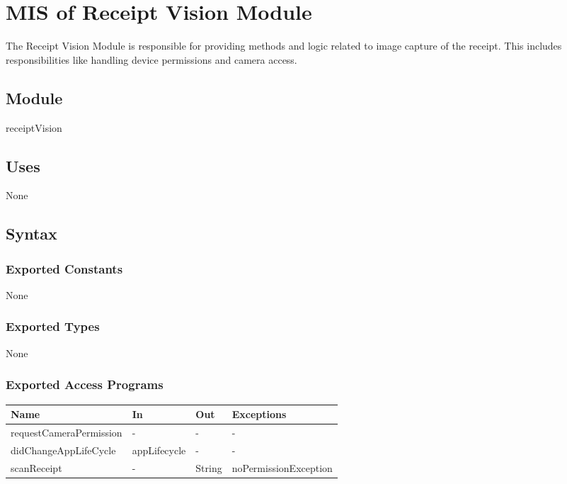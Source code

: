 \documentclass[12pt, titlepage]{article}
\begin{document}
\section{MIS of Receipt Vision Module} \label{mVision}

The Receipt Vision Module is responsible for providing methods and logic related to image
capture of the receipt. This includes responsibilities like handling device permissions and camera access.

\subsection{Module}

receiptVision

\subsection{Uses}

None

\subsection{Syntax}

\subsubsection{Exported Constants}

None

\subsubsection{Exported Types}

None

\subsubsection{Exported Access Programs}

\begin{center}
  \begin{tabular}{p{5cm} p{4cm} p{3cm} p{4cm}}
  \hline
  \textbf{Name} & \textbf{In} & \textbf{Out} & \textbf{Exceptions} \\
  \hline
  requestCameraPermission & - & - & - \\
  didChangeAppLifeCycle & appLifecycle & - & - \\
  scanReceipt & - & String & noPermissionException \\
  \hline
  \end{tabular}
\end{center}
\end{document}
